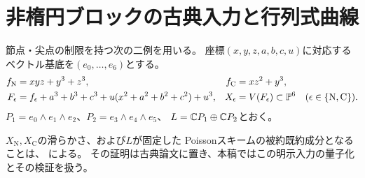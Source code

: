 \section{非楕円ブロックの古典入力と行列式曲線}\label{cq:nonelliptic-data}
節点・尖点の制限を持つ次の二例を用いる。
座標$(x,y,z,a,b,c,u)$に対応するベクトル基底を$(e_0,\ldots,e_6)$とする。
\begin{equation}\label{cq:nonelliptic-F}
\begin{aligned}
 f_{\mathrm N}&=xyz+y^3+z^3,& f_{\mathrm C}&=xz^2+y^3,\\
 F_\epsilon&=f_\epsilon+a^3+b^3+c^3+u(x^2+a^2+b^2+c^2)+u^3,
 &X_\epsilon&=V(F_\epsilon)\subset\mathbb P^6
 \quad(\epsilon\in\{\mathrm N,\mathrm C\}).
\end{aligned}
\end{equation}
$P_1=e_0\wedge e_1\wedge e_2$、$P_2=e_3\wedge e_4\wedge e_5$、
$L=\mathbb C P_1\oplus\mathbb C P_2$とおく。


$X_{\mathrm N},X_{\mathrm C}$の滑らかさ、および$L$が固定した
Poissonスキームの被約既約成分となることは、
\cite[非楕円型を一般点に持つ既約成分の定理]{PoissonCubic}による。
その証明は古典論文に置き、本稿ではこの明示入力の量子化とその検証を扱う。


